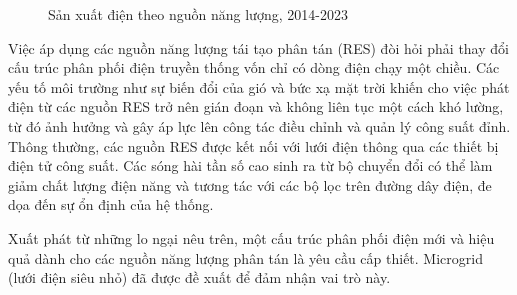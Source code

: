 \begin{figure}
    \centering
    
    \caption{Sản xuất điện theo nguồn năng lượng, 2014-2023}
    \label{fig:C1_2}
\end{figure}
Việc áp dụng các nguồn năng lượng tái tạo phân tán (RES) đòi hỏi phải thay đổi cấu trúc phân phối điện truyền thống vốn chỉ có dòng điện chạy một chiều. Các yếu tố môi trường như sự biến đổi của gió và bức xạ mặt trời khiến cho việc phát điện từ các nguồn RES trở nên gián đoạn và không liên tục một cách khó lường, từ đó ảnh hưởng và gây áp lực lên công tác điều chỉnh và quản lý công suất đỉnh. Thông thường, các nguồn RES được kết nối với lưới điện thông qua các thiết bị điện tử công suất. Các sóng hài tần số cao sinh ra từ bộ chuyển đổi có thể làm giảm chất lượng điện năng và tương tác với các bộ lọc trên đường dây điện, đe dọa đến sự ổn định của hệ thống.\par
Xuất phát từ những lo ngại nêu trên, một cấu trúc phân phối điện mới và hiệu quả dành cho các nguồn năng lượng phân tán là yêu cầu cấp thiết. Microgrid (lưới điện siêu nhỏ) đã được đề xuất để đảm nhận vai trò này.
